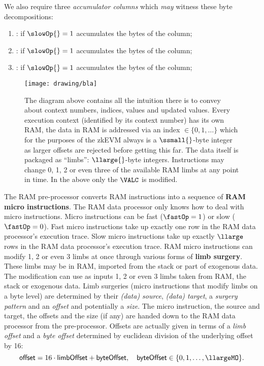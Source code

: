We also require three \emph{accumulator columns} which \emph{may} witness these byte decompositions:
\begin{enumerate}[resume]
	\item {}: if $\slowOp{} = 1$ accumulates the bytes of the \byteA{} column;
	\item {}: if $\slowOp{} = 1$ accumulates the bytes of the \byteB{} column;
	\item {}: if $\slowOp{} = 1$ accumulates the bytes of the \byteC{} column;
\end{enumerate}
\begin{figure}
\centering
\texttt{[image: drawing/bla]}
\caption{The diagram above contains all the intuition there is to convey about context numbers, indices, values and updated values. Every execution context (identified by its context number) has its own RAM, the data in RAM is addressed via an index $\in\{0,1,\dots\}$ which for the purposes of the zkEVM always is a $\ssmall{}$-byte integer as larger offsets are rejected before getting this far. The data itself is packaged as ``limbs'': $\llarge{}$-byte integers. Instructions may change 0, 1, 2 or even three of the available RAM limbs at any point in time. In the above only the $\VALC$ is modified.}
\end{figure}

The RAM pre-processor converts RAM instructions into a sequence of \textbf{RAM micro instructions}\label{def: RAM micro instruction}. The RAM data processor only knows how to deal with micro instructions. Micro instructions can be fast ($\fastOp = 1$) or slow ($\fastOp = 0$). Fast micro instructions take up exactly one row in the RAM data processor's execution trace. Slow micro instructions take up exactly $\llarge$ rows in the RAM data processor's execution trace. RAM micro instructions can modify 1, 2 or even 3 limbs at once through various forms of \textbf{limb surgery}. These limbs may be in RAM, imported from the stack or part of exogenous data. The modification can use as inputs 1, 2 or even 3 limbs taken from RAM, the stack or exogenous data. Limb surgeries (micro instructions that modify limbs on a byte level) are determined by their \emph{(data) source}, \emph{(data) target}, a \emph{surgery pattern} and an \emph{offset} and potentially a \emph{size}. The micro instruction, the source and target, the offsets and the size (if any) are handed down to the RAM data processor from the pre-processor. Offsets are actually given in terms of a \emph{limb offset} and a \emph{byte offset} determined by euclidean division of the underlying offset by 16: 
\[
	\textsf{offset} = 16\cdot \textsf{limbOffset} + \textsf{byteOffset},
	\quad
	\textsf{byteOffset} \in \{0,1,\dots,\llargeMO\}.
\]

